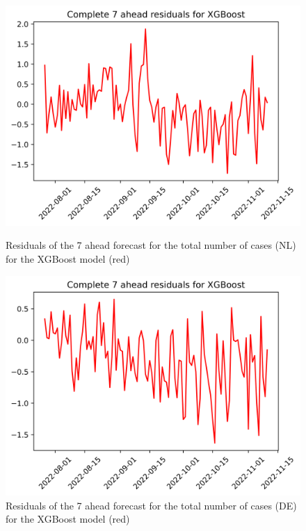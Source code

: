 \begin{figure}

\begin{minipage}{.32\textwidth}
  \centering
  \includegraphics[width=\linewidth]{pics/7_ah/7_ahead_errors_XGBoost.png}
  \caption{Residuals of the 7 ahead forecast for the total number of cases (NL) for the XGBoost model (red)}
  \label{fig:tot_cases_error_7_xgb}
\end{minipage}
\begin{minipage}{.32\textwidth}
  \centering
  \includegraphics[width=\linewidth]{pics/7_ah/DE_7_ahead_errors_XGBoost.png}
  \caption{Residuals of the 7 ahead forecast for the total number of cases (DE) for the XGBoost model (red)}
  \label{fig:tot_cases_error_7_xgb_DE}

\end{minipage}
\end{figure}
